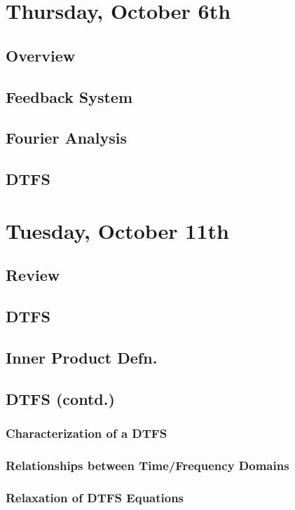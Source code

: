 \section{Thursday, October 6th}
\subsection{Overview}
\subsection{Feedback System}
\subsection{Fourier Analysis}
\subsection{DTFS}


\section{Tuesday, October 11th}
\subsection{Review}
\subsection{DTFS}
\subsection{Inner Product Defn.}
\subsection{DTFS (contd.)}
\subsubsection{Characterization of a DTFS}
\subsubsection{Relationships between Time/Frequency Domains}
\subsubsection{Relaxation of DTFS Equations}


